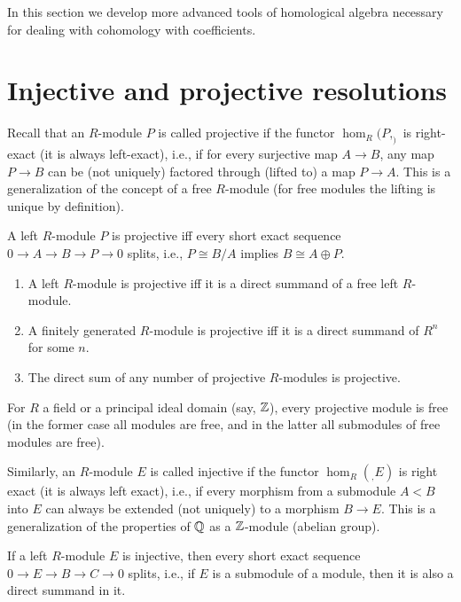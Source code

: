 In this section we develop more advanced tools of homological algebra necessary for dealing with cohomology with coefficients.

\section{Injective and projective resolutions}


Recall that an  $R$-module $P$ is called projective if the functor $\hom_R(P,_)$ is right-exact (it is always left-exact), i.e., if for every surjective map $A\to B$, any map $P\to B$ can be (not uniquely) factored through (lifted to) a map $P\to A$. This is a generalization of the concept of a free $R$-module (for free modules the lifting is unique by definition).

\begin{prop}
    A left $R$-module $P$ is projective iff every short exact sequence $0\to A\to B\to P\to 0$ splits, i.e., $P\cong B/A$ implies $B\cong A\oplus P$.
\end{prop}

\begin{thm}
    \begin{enumerate}
        \item A left $R$-module is projective iff it is a direct summand of a free left $R$-module.
        \item A finitely generated $R$-module  is projective iff it is a direct summand of $R^n$ for some $n$.
        \item The direct sum of any number of projective $R$-modules is projective.
    \end{enumerate}
\end{thm}

For $R$ a field or a principal ideal domain (say, $\mathbb{Z}$), every projective module is free (in the former case all modules are free, and in the latter all submodules of free modules are free).


Similarly, an $R$-module $E$ is called injective if the functor $\hom_R(_,E)$ is right exact (it is always left exact), i.e., if every morphism from a submodule $A<B$ into $E$ can always be extended (not uniquely) to a morphism $B\to E$. This is a generalization of the properties of $\mathbb{Q}$ as a $\mathbb{Z}$-module (abelian group).

\begin{prop}
    If a left $R$-module $E$ is injective, then every short exact sequence $0\to E\to B\to C\to 0$ splits, i.e., if $E$ is a submodule of a module, then it is also a direct summand in it.
\end{prop}

